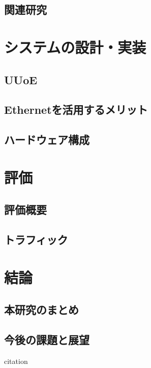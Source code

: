 \section{関連研究}

\chapter{システムの設計・実装}
\section{UUoE}
\section{Ethernetを活用するメリット}
\section{ハードウェア構成}


\chapter{評価}
\section{評価概要}
\section{トラフィック}

\chapter{結論}
\section{本研究のまとめ}
\section{今後の課題と展望}

citation\cite{hoge09}
